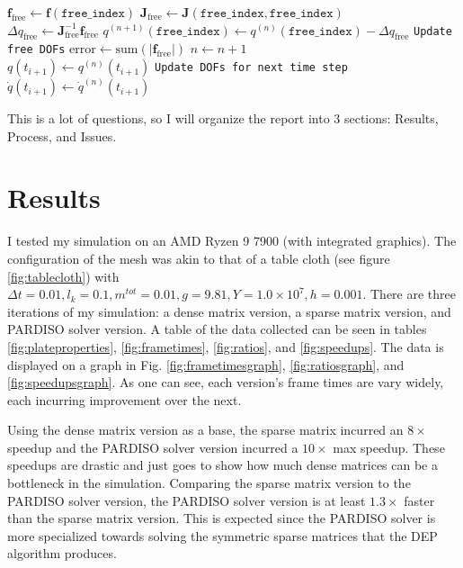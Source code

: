 \documentclass[letterpaper, 10 pt, conference]{ieeeconf}  %
\begin{document}
\begin{algorithm}[h]
\begin{algorithmic}[1]
                        \State $\mathbf{f}_\text{free} \gets \mathbf{f}(\texttt{free\_index})$
                        \State $\mathbf{J}_\text{free} \gets \mathbf{J}(\texttt{free\_index}, \texttt{free\_index})$\\
                        \State $\Delta q_\text{free} \gets \mathbf{J}_\text{free}^{-1} \mathbf{f}_\text{free}$
                        \State $q^{(n+1)}(\texttt{free\_index}) \gets q^{(n)}(\texttt{free\_index}) - \Delta q_\text{free}$ \hfill \texttt{Update free DOFs}
                        \State $\text{error} \gets \text{sum}(\lvert \mathbf{f}_\text{free} \rvert)$
                        \State $n \gets n + 1$ \\
                    \EndWhile
                    \State $q(t_{i+1}) \gets q^{(n)}(t_{i+1})$                  \hfill \texttt{Update DOFs for next time step}
                    \State $\dot{q}(t_{i+1}) \gets \dot{q}^{(n)}(t_{i+1})$
                \EndFunction
                \end{algorithmic}
                \end{algorithm}
\twocolumn


This is a lot of questions, so I will organize the report into 3 sections: Results, Process, and Issues. 

\section{Results}
I tested my simulation on an AMD Ryzen 9 7900 (with integrated graphics). The configuration of the mesh was akin to that of a table cloth (see figure \ref{fig:tablecloth}) with $\Delta t = 0.01, l_k = 0.1, m^{tot} = 0.01, g = 9.81, Y=1.0\times 10^7, h = 0.001$. There are three iterations of my simulation: a dense matrix version, a sparse matrix version, and PARDISO solver version. A table of the data collected can be seen in tables \ref{fig:plateproperties}, \ref{fig:frametimes}, \ref{fig:ratios}, and \ref{fig:speedups}. The data is displayed on a graph in Fig. \ref{fig:frametimesgraph}, \ref{fig:ratiosgraph}, and \ref{fig:speedupsgraph}. As one can see, each version's frame times are vary widely, each incurring improvement over the next. 

Using the dense matrix version as a base, the sparse matrix incurred an $8\times$ speedup and the PARDISO solver version incurred a $10\times$ max speedup. These speedups are drastic and just goes to show how much dense matrices can be a bottleneck in the simulation. Comparing the sparse matrix version to the PARDISO solver version, the PARDISO solver version is at least $1.3\times$ faster than the sparse matrix version. This is expected since the PARDISO solver is more specialized towards solving the symmetric sparse matrices that the DEP algorithm produces.
\end{document}
